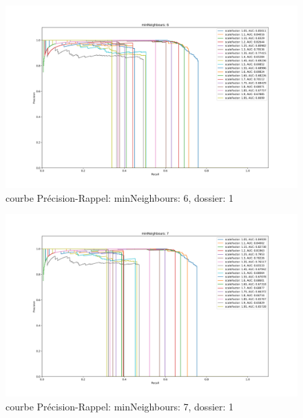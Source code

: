 \documentclass[a4paper,11pt]{article}
\begin{document}
	\begin{figure}[H]
	    \begin{center}
		\includegraphics[scale = 0.4]{images/courbes/folder_01_minN_6.png}
		\caption{courbe Précision-Rappel: minNeighbours: 6, dossier: 1}
		\label{fig:minN_2}
	    \end{center}
	\end{figure}

	\begin{figure}[H]
	    \begin{center}
		\includegraphics[scale = 0.4]{images/courbes/folder_01_minN_7.png}
		\caption{courbe Précision-Rappel: minNeighbours: 7, dossier: 1}
		\label{fig:minN_2}
	    \end{center}
	\end{figure}
\end{document}
